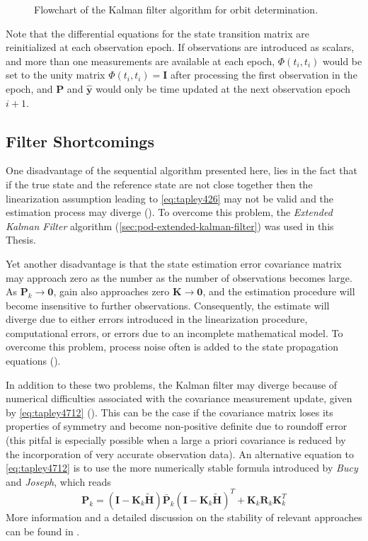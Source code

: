 \begin{figure}
    \centering
    
    \caption{Flowchart of the Kalman filter algorithm for orbit determination.}
    \label{fig:kalman-pod}
\end{figure}

Note that the differential equations for the state transition matrix are 
reinitialized at each observation epoch. If observations are introduced as 
scalars, and more than one measurements are available at each epoch, $\Phi (t_i,t_i)$ 
would be set to the unity matrix $\Phi (t_i,t_i) = \bm{I}$ after processing the first 
observation in the epoch, and $\bm{P}$ and $\hat{\bm{y}}$ would only be time updated 
at the next observation epoch $i+1$.

\subsection{Filter Shortcomings}\label{ssec:pod-kalman-filter-shortcomings}
One disadvantage of the sequential algorithm presented here, lies in the fact
that if the true state and the reference state are not close together then the 
linearization assumption leading to \autoref{eq:tapley426} may not be valid and 
the estimation process may diverge (\cite{Tapley2004}). To overcome this problem, 
the \emph{Extended Kalman Filter} algorithm (\autoref{sec:pod-extended-kalman-filter}) 
was used in this Thesis.

Yet another disadvantage is that the state estimation error covariance matrix may 
approach zero as the number as the number of observations becomes large. As 
$\bm{P}_k \to \bm{0}$, gain also approaches zero $\bm{K} \to \bm{0}$, and the 
estimation procedure will become insensitive to further observations. Consequently, 
the estimate will diverge due to either errors introduced in the linearization 
procedure, computational errors, or errors due to an incomplete mathematical model. 
To overcome this problem, process noise often is added to the state propagation 
equations (\cite{Tapley2004}).

In addition to these two problems, the Kalman filter may diverge because of
numerical difficulties associated with the covariance measurement update, given
by \autoref{eq:tapley4712} (\cite{Tapley2004}). This can be the case if the 
covariance matrix loses its properties of symmetry and become non-positive definite 
due to roundoff error (this pitfal is especially possible when a large a priori 
covariance is reduced by the incorporation of very accurate observation data). 
An alternative equation to \autoref{eq:tapley4712} is to use the more numerically 
stable formula introduced by \emph{Bucy} and \emph{Joseph}, which reads
\begin{equation}\label{eq:tapley4719}
    \bm{P}_k = \left( \bm{I} - \bm{K}_k \tilde{\bm{H}} \right) \bar{\bm{P}}_k
    \left( \bm{I} - \bm{K}_k \tilde{\bm{H}} \right)^{T} 
    + \bm{K}_k \bm{R}_k \bm{K}^{T}_k
\end{equation}
More information and a detailed discussion on the stability of relevant approaches 
can be found in \cite{Bierman1977}.
